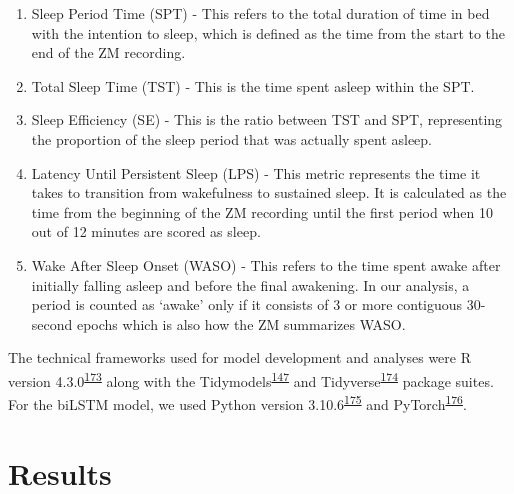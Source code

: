 \documentclass[
  10pt,
]{scrbook}
\providecommand{\tightlist}{%
  \setlength{\itemsep}{0pt}\setlength{\parskip}{0pt}}\usepackage{longtable,booktabs,array}
\begin{document}
\begin{enumerate}
\def\labelenumi{\arabic{enumi}.}
\tightlist
\item
  Sleep Period Time (SPT) - This refers to the total duration of time in
  bed with the intention to sleep, which is defined as the time from the
  start to the end of the ZM recording.
\item
  Total Sleep Time (TST) - This is the time spent asleep within the SPT.
\item
  Sleep Efficiency (SE) - This is the ratio between TST and SPT,
  representing the proportion of the sleep period that was actually
  spent asleep.
\item
  Latency Until Persistent Sleep (LPS) - This metric represents the time
  it takes to transition from wakefulness to sustained sleep. It is
  calculated as the time from the beginning of the ZM recording until
  the first period when 10 out of 12 minutes are scored as sleep.
\item
  Wake After Sleep Onset (WASO) - This refers to the time spent awake
  after initially falling asleep and before the final awakening. In our
  analysis, a period is counted as `awake' only if it consists of 3 or
  more contiguous 30-second epochs which is also how the ZM summarizes
  WASO.
\end{enumerate}

The technical frameworks used for model development and analyses were R
version
4.3.0\textsuperscript{\protect\hyperlink{ref-rcoreteam_2023}{173}} along
with the
Tidymodels\textsuperscript{\protect\hyperlink{ref-kuhn_tidymodels_2020}{147}}
and
Tidyverse\textsuperscript{\protect\hyperlink{ref-wickham_tidyverse_2019}{174}}
package suites. For the biLSTM model, we used Python version
3.10.6\textsuperscript{\protect\hyperlink{ref-vanrossum_python_2009}{175}}
and
PyTorch\textsuperscript{\protect\hyperlink{ref-paszke_pytorch_2019}{176}}.

\hypertarget{results-2}{%
\section{Results}\label{results-2}}
\end{document}
